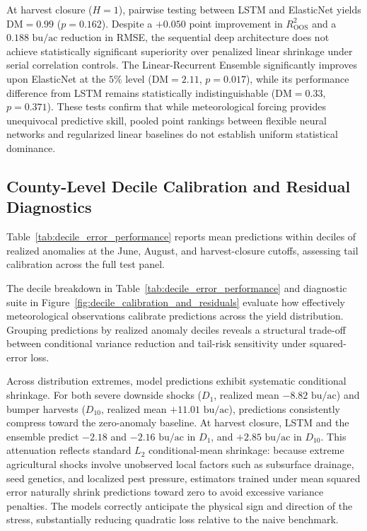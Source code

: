 At harvest closure ($H=1$), pairwise testing between LSTM and ElasticNet yields $\text{DM} = 0.99$ ($p = 0.162$). Despite a $+0.050$ point improvement in $R^2_{\text{OOS}}$ and a $0.188\text{ bu/ac}$ reduction in RMSE, the sequential deep architecture does not achieve statistically significant superiority over penalized linear shrinkage under serial correlation controls. The Linear-Recurrent Ensemble significantly improves upon ElasticNet at the $5\%$ level ($\text{DM} = 2.11$, $p = 0.017$), while its performance difference from LSTM remains statistically indistinguishable ($\text{DM} = 0.33$, $p = 0.371$). These tests confirm that while meteorological forcing provides unequivocal predictive skill, pooled point rankings between flexible neural networks and regularized linear baselines do not establish uniform statistical dominance.

\subsection{County-Level Decile Calibration and Residual Diagnostics}
\label{sec:res_decile_diagnostics}

Table~\ref{tab:decile_error_performance} reports mean predictions within deciles of realized anomalies at the June, August, and harvest-closure cutoffs, assessing tail calibration across the full test panel.



The decile breakdown in Table~\ref{tab:decile_error_performance} and diagnostic suite in Figure~\ref{fig:decile_calibration_and_residuals} evaluate how effectively meteorological observations calibrate predictions across the yield distribution. Grouping predictions by realized anomaly deciles reveals a structural trade-off between conditional variance reduction and tail-risk sensitivity under squared-error loss.

Across distribution extremes, model predictions exhibit systematic conditional shrinkage. For both severe downside shocks ($D_1$, realized mean $-8.82\text{ bu/ac}$) and bumper harvests ($D_{10}$, realized mean $+11.01\text{ bu/ac}$), predictions consistently compress toward the zero-anomaly baseline. At harvest closure, LSTM and the ensemble predict $-2.18$ and $-2.16\text{ bu/ac}$ in $D_1$, and $+2.85\text{ bu/ac}$ in $D_{10}$. This attenuation reflects standard $L_2$ conditional-mean shrinkage: because extreme agricultural shocks involve unobserved local factors such as subsurface drainage, seed genetics, and localized pest pressure, estimators trained under mean squared error naturally shrink predictions toward zero to avoid excessive variance penalties. The models correctly anticipate the physical sign and direction of the stress, substantially reducing quadratic loss relative to the naive benchmark.


